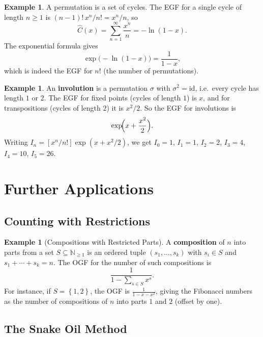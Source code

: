 \documentclass[12pt,a4paper,openany]{book}
\theoremstyle{definition}
\newtheorem{example}[definition]{Example}
\theoremstyle{plain}
\theoremstyle{remark}
\newcommand{\N}{\mathbb{N}}
\newcommand{\set}[1]{\left\{#1\right\}}
\begin{document}
\begin{example}\label{ex:exp-formula-permutations}
A permutation is a set of cycles.  The EGF for a single cycle of length
$n\ge 1$ is $(n-1)!\,x^n/n! = x^n/n$, so
\[
  \hat{C}(x) = \sum_{n=1}^{\infty}\frac{x^n}{n} = -\ln(1-x).
\]
The exponential formula gives
\[
  \exp\!\bigl(-\ln(1-x)\bigr) = \frac{1}{1-x},
\]
which is indeed the EGF for $n!$ (the number of permutations).
\end{example}

\begin{example}\label{ex:exp-formula-involutions}
An \textbf{involution} is a permutation $\sigma$ with $\sigma^2 = \mathrm{id}$,
i.e.\ every cycle has length $1$ or $2$.  The EGF for fixed points
(cycles of length $1$) is $x$, and for transpositions (cycles of length
$2$) it is $x^2/2$.  So the EGF for involutions is
\[
  \exp\!\Bigl(x + \frac{x^2}{2}\Bigr).
\]
Writing $I_n = [x^n/n!]\exp(x+x^2/2)$, we get $I_0=1$, $I_1=1$,
$I_2=2$, $I_3=4$, $I_4=10$, $I_5=26$.
\end{example}



\section{Further Applications}\label{sec:gf-further}

\subsection{Counting with Restrictions}\label{ssec:gf-restrictions}

\begin{example}[Compositions with Restricted Parts]\label{ex:ogf-restricted}
A \textbf{composition} of $n$ into parts from a set
$S \subseteq \N_{\ge 1}$ is an ordered tuple $(s_1,\dots,s_k)$ with
$s_i \in S$ and $s_1+\cdots+s_k = n$.  The OGF for the number of such
compositions is
\[
  \frac{1}{1 - \sum_{s\in S}x^s}.
\]
For instance, if $S = \set{1,2}$, the OGF is $\frac{1}{1-x-x^2}$,
giving the Fibonacci numbers as the number of compositions of $n$ into
parts $1$ and $2$ (offset by one).
\end{example}

\subsection{The Snake Oil Method}\label{ssec:snake-oil}
\end{document}
